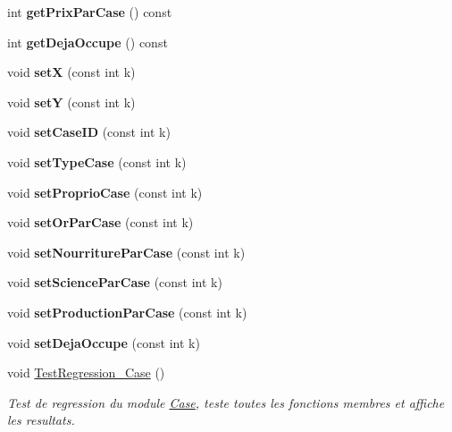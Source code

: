 \begin{DoxyCompactItemize}
int {\bfseries get\+Prix\+Par\+Case} () const
\item 
\mbox{\label{classCase_a511c62c0804caaf24e073f62ef4bbec8}} 
int {\bfseries get\+Deja\+Occupe} () const
\item 
\mbox{\label{classCase_ab03efe9fa9eb9575c4d4dfe9383a9c96}} 
void {\bfseries setX} (const int k)
\item 
\mbox{\label{classCase_a15e5b02ddba96af55e185a67062d07de}} 
void {\bfseries setY} (const int k)
\item 
\mbox{\label{classCase_a661fa037f3f11044d61d50a1a29fd279}} 
void {\bfseries set\+Case\+ID} (const int k)
\item 
\mbox{\label{classCase_a1b4a41f486da89e5eac27d7e10268349}} 
void {\bfseries set\+Type\+Case} (const int k)
\item 
\mbox{\label{classCase_adac642cb17b8be1142e53481a191409c}} 
void {\bfseries set\+Proprio\+Case} (const int k)
\item 
\mbox{\label{classCase_aab3c728ae37cff0bed6c4ff87f72672b}} 
void {\bfseries set\+Or\+Par\+Case} (const int k)
\item 
\mbox{\label{classCase_a3a3a6022f0abf7bc72194956823acec7}} 
void {\bfseries set\+Nourriture\+Par\+Case} (const int k)
\item 
\mbox{\label{classCase_a3f5733cf54080ef3e82a0869c845d988}} 
void {\bfseries set\+Science\+Par\+Case} (const int k)
\item 
\mbox{\label{classCase_ade964e2c2192de784efeb051147beef4}} 
void {\bfseries set\+Production\+Par\+Case} (const int k)
\item 
\mbox{\label{classCase_a239fb3a0e430e3cae7bb10dbb8432a61}} 
void {\bfseries set\+Deja\+Occupe} (const int k)
\item 
void \hyperlink{classCase_aca943dd6259fb44eeea2addd610a2f9d}{Test\+Regression\+\_\+\+Case} ()
\begin{DoxyCompactList}\small\item\em Test de regression du module \hyperlink{classCase}{Case}, teste toutes les fonctions membres et affiche les resultats. \end{DoxyCompactList}\end{DoxyCompactItemize}


